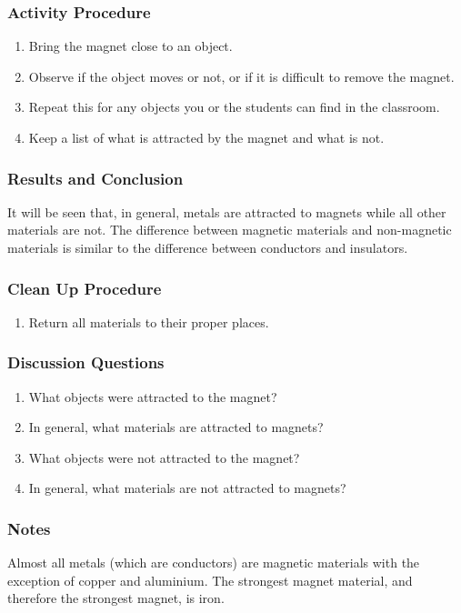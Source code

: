 \subsubsection*{Activity Procedure}
\begin{enumerate}
\item{Bring the magnet close to an object.} 
\item{Observe if the object moves or not, or if it is difficult to remove the magnet.} 
\item{Repeat this for any objects you or the students can find in the classroom.} 
\item{Keep a list of what is attracted by the magnet and what is not.} 
\end{enumerate}

\subsubsection*{Results and Conclusion}
It will be seen that, in general, metals are attracted to magnets while all other materials are not. The difference between magnetic materials and non-magnetic materials is similar to the difference between conductors and insulators.  

\subsubsection*{Clean Up Procedure}
\begin{enumerate}
\item{Return all materials to their proper places.} 
\end{enumerate}

\subsubsection*{Discussion Questions}
\begin{enumerate}
\item{What objects were attracted to the magnet?}
\item{In general, what materials are attracted to magnets?}
\item{What objects were not attracted to the magnet?}
\item{In general, what materials are not attracted to magnets?}
\end{enumerate}

\subsubsection*{Notes}
Almost all metals (which are conductors) are magnetic materials with the exception of copper and aluminium. The strongest magnet material, and therefore the strongest magnet, is iron.  

